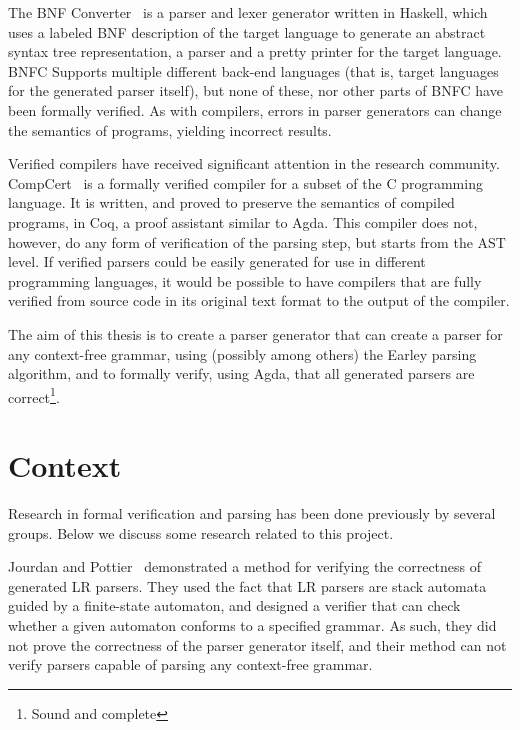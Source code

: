 \documentclass{article}
\begin{document}
	The BNF Converter~\cite{BNFC} is a parser and lexer generator written in
	Haskell, which uses a labeled BNF description of the target language to
	generate an abstract syntax tree representation, a parser and a pretty
	printer for the target language. BNFC Supports multiple different back-end
	languages (that is, target languages for the generated parser itself), but
	none of these, nor other parts of BNFC have been formally verified. As with
	compilers, errors in parser generators can change the semantics of
	programs, yielding incorrect results. 
	
	

	Verified compilers have received significant attention in the research
	community. CompCert~\cite{Leroy} is a formally verified compiler for a
	subset of the C programming language. It is written, and proved to preserve
	the semantics of compiled programs, in Coq, a proof assistant similar to
	Agda. This compiler does not, however, do any form of verification of the
	parsing step, but starts from the AST level. If verified parsers could be
	easily generated for use in different programming languages, it would be
	possible to have compilers that are fully verified from source code in its
	original text format to the output of the compiler.
	
	The aim of this thesis is to create a parser generator that can create a
	parser for any context-free grammar, using (possibly among others) the
	Earley parsing algorithm, and to formally verify, using Agda, that all
	generated parsers are correct\footnote{Sound and complete}. 
	

\section{Context}

	Research in formal verification and parsing has been done previously by
	several groups. Below we discuss some research related to this project.

	Jourdan and Pottier~\cite{Jourdan} demonstrated a method for verifying the
	correctness of generated LR parsers. They used the fact that LR parsers are
	stack automata guided by a finite-state automaton, and designed a verifier
	that can check whether a given automaton conforms to a specified grammar.
	As such, they did not prove the correctness of the parser generator itself,
	and their method can not verify parsers capable of parsing any context-free
	grammar.
	
\end{document}

